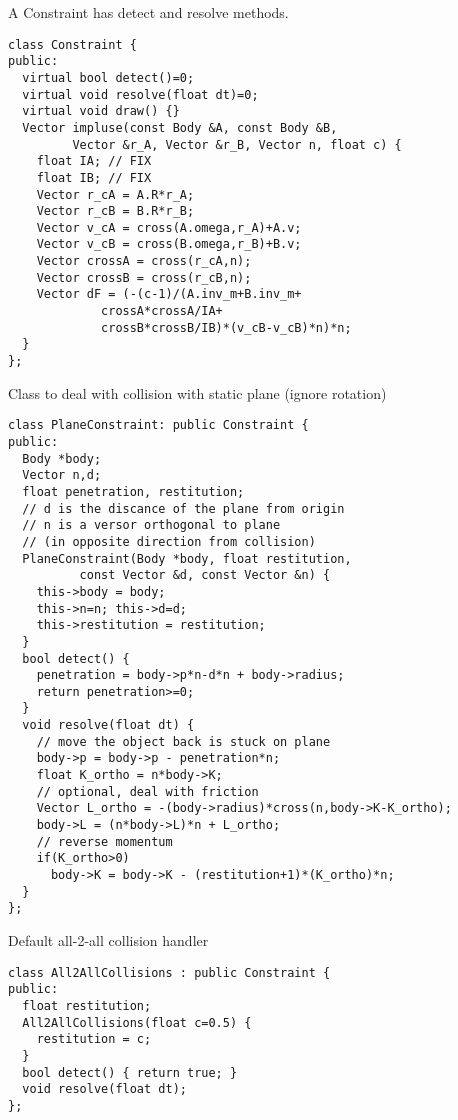 A Constraint has detect and resolve methods.
\begin{lstlisting}
class Constraint {
public:  
  virtual bool detect()=0;
  virtual void resolve(float dt)=0;
  virtual void draw() {}
  Vector impluse(const Body &A, const Body &B, 
		 Vector &r_A, Vector &r_B, Vector n, float c) {
    float IA; // FIX
    float IB; // FIX
    Vector r_cA = A.R*r_A;
    Vector r_cB = B.R*r_B;
    Vector v_cA = cross(A.omega,r_A)+A.v;
    Vector v_cB = cross(B.omega,r_B)+B.v;
    Vector crossA = cross(r_cA,n);
    Vector crossB = cross(r_cB,n);
    Vector dF = (-(c-1)/(A.inv_m+B.inv_m+
			 crossA*crossA/IA+
			 crossB*crossB/IB)*(v_cB-v_cB)*n)*n;
  }
};
\end{lstlisting}

Class to deal with collision with static plane
(ignore rotation)
\begin{lstlisting}
class PlaneConstraint: public Constraint {
public:
  Body *body;
  Vector n,d;
  float penetration, restitution;
  // d is the discance of the plane from origin
  // n is a versor orthogonal to plane 
  // (in opposite direction from collision)
  PlaneConstraint(Body *body, float restitution,
		  const Vector &d, const Vector &n) {
    this->body = body;
    this->n=n; this->d=d;
    this->restitution = restitution;
  }
  bool detect() {
    penetration = body->p*n-d*n + body->radius;
    return penetration>=0;
  }
  void resolve(float dt) {
    // move the object back is stuck on plane 
    body->p = body->p - penetration*n;
    float K_ortho = n*body->K;
    // optional, deal with friction 
    Vector L_ortho = -(body->radius)*cross(n,body->K-K_ortho);
    body->L = (n*body->L)*n + L_ortho;
    // reverse momentum
    if(K_ortho>0)
      body->K = body->K - (restitution+1)*(K_ortho)*n;
  }
};
\end{lstlisting}

Default all-2-all collision handler
\begin{lstlisting}
class All2AllCollisions : public Constraint {
public:  
  float restitution;
  All2AllCollisions(float c=0.5) {
    restitution = c;
  }
  bool detect() { return true; }
  void resolve(float dt);
};
\end{lstlisting}

